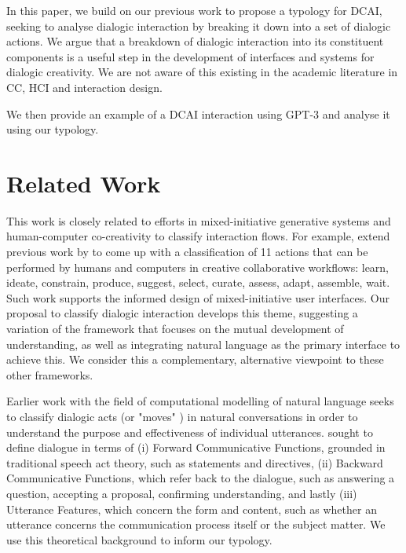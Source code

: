 \documentclass[acmlarge, nonacm, screen]{acmart} %
\begin{document}
In this paper, we build on our previous work to propose a typology for DCAI, seeking to analyse dialogic interaction by breaking it down into a set of dialogic actions. We argue that a breakdown of dialogic interaction into its constituent components is a useful step in the development of interfaces and systems for dialogic creativity. We are not aware of this existing in the academic literature in CC, HCI and interaction design. 

We then provide an example of a DCAI interaction using GPT-3 and analyse it using our typology. 

\section{Related Work}

This work is closely related to efforts in mixed-initiative generative systems and human-computer co-creativity to classify interaction flows. For example, \citet{mullermixed} extend previous work by \citep{spoto17} to come up with a classification of 11 actions that can be performed by humans and computers in creative collaborative workflows: learn, ideate, constrain, produce, suggest, select, curate, assess, adapt, assemble, wait. Such work supports the informed design of mixed-initiative user interfaces. Our proposal to classify dialogic interaction develops this theme, suggesting a variation of the framework that focuses on the mutual development of understanding, as well as integrating natural language as the primary interface to achieve this. We consider this a complementary, alternative viewpoint to these other frameworks. 

Earlier work with the field of computational modelling of natural language seeks to classify dialogic acts (or "moves" \citep{ginzburg201016}) in natural conversations in order to understand the purpose and effectiveness of individual utterances. \citet{core1997coding} sought to define dialogue in terms of (i) Forward Communicative Functions, grounded in traditional speech act theory, such as statements and directives, (ii) Backward Communicative Functions, which refer back to the dialogue, such as answering a question, accepting a proposal, confirming understanding, and lastly (iii) Utterance Features, which concern the form and content, such as whether an utterance concerns the communication process itself or the subject matter. We use this theoretical background to inform our typology.
\end{document}
